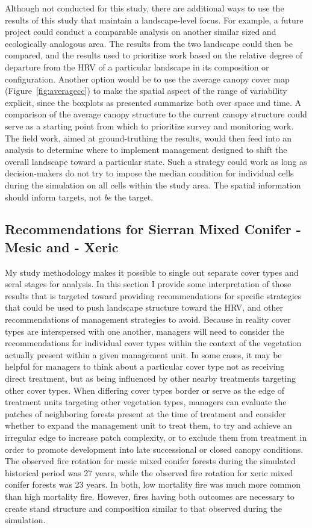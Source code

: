 Although not conducted for this study, there are additional ways to use the results of this study that maintain a landscape-level focus. For example, a future project could conduct a comparable analysis on another similar sized and ecologically analogous area. The results from the two landscape could then be compared, and the results used to prioritize work based on the relative degree of departure from the HRV of a particular landscape in its composition or configuration. Another option would be to use the average canopy cover map (Figure~\ref{fig:averagecc}) to make the spatial aspect of the range of variability explicit, since the boxplots as presented summarize both over space and time. A comparison of the average canopy structure to the current canopy structure could serve as a starting point from which to prioritize survey and monitoring work. The field work, aimed at ground-truthing the results, would then feed into an analysis to determine where to implement management designed to shift the overall landscape toward a particular state. Such a strategy could work as long as decision-makers do not try to impose the median condition for individual cells during the simulation on all cells within the study area. The spatial information should inform targets, not \emph{be} the target.

\subsection{Recommendations for Sierran Mixed Conifer - Mesic and - Xeric}
My study methodology makes it possible to single out separate cover types and seral stages for analysis. In this section I provide some interpretation of those results that is targeted toward providing recommendations for specific strategies that could be used to push landscape structure toward the HRV, and other recommendations of management strategies to avoid. Because in reality cover types are interspersed with one another, managers will need to consider the recommendations for individual cover types within the context of the vegetation actually present within a given management unit. In some cases, it may be helpful for managers to think about a particular cover type not as receiving direct treatment, but as being influenced by other nearby treatments targeting other cover types. When differing cover types border or serve as the edge of treatment units targeting other vegetation types, managers can evaluate the patches of neighboring forests present at the time of treatment and consider whether to expand the management unit to treat them, to try and achieve an irregular edge to increase patch complexity, or to exclude them from treatment in order to promote development into late successional or closed canopy conditions. The observed fire rotation for mesic mixed conifer forests during the simulated historical period was 27 years, while the observed fire rotation for xeric mixed conifer forests was 23 years. In both, low mortality fire was much more common than high mortality fire. However, fires having both outcomes are necessary to create stand structure and composition similar to that observed during the simulation. 

